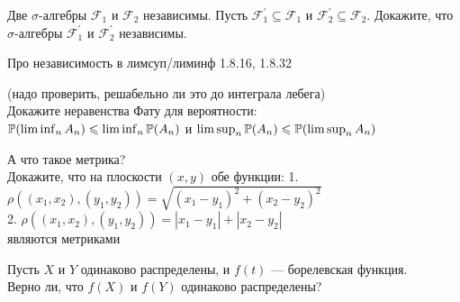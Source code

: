 \begin{problem}
Две $\sigma$-алгебры $\mathcal{F}_{1}$ и $\mathcal{F}_{2}$
независимы. Пусть $\mathcal{F}_{1}^{'}\subseteq \mathcal{F}_{1}$ и
$\mathcal{F}_{2}^{'}\subseteq \mathcal{F}_{2}$. Докажите, что
$\sigma$-алгебры $\mathcal{F}_{1}^{'}$ и $\mathcal{F}_{2}^{'}$
независимы. 
\end{problem} 
\begin{solution} 

\end{solution}

\begin{problem}
Про независимость в лимсуп/лиминф 1.8.16, 1.8.32 
\end{problem} 
\begin{solution} 

\end{solution}

\begin{problem}
 (надо проверить, решабельно ли это до интеграла лебега) \\
Докажите неравенства Фату для вероятности: \\
$\P(\liminf_{n}A_{n})\le \liminf_{n}\P(A_{n})$ и
$\limsup_{n}\P(A_{n})\le \P(\limsup_{n}A_{n})$ 
\end{problem} 
\begin{solution} 

\end{solution}

\begin{problem}
 А что такое метрика? \\
Докажите, что на плоскости $(x,y)$ обе функции:
1. $\rho((x_{1},x_{2}),(y_{1},y_{2}))=\sqrt{(x_{1}-y_{1})^{2}+(x_{2}-y_{2})^{2}}$ \\
2. $\rho((x_{1},x_{2}),(y_{1},y_{2}))=|x_{1}-y_{1}|+|x_{2}-y_{2}|$ \\
являются метриками 
\end{problem} 
\begin{solution} 

\end{solution}

\begin{problem}
Пусть $X$ и $Y$ одинаково распределены, и $f(t)$ --- борелевская
функция. \\
Верно ли, что $f(X)$ и $f(Y)$ одинаково распределены? 
\end{problem} 
\begin{solution} 

\end{solution}

